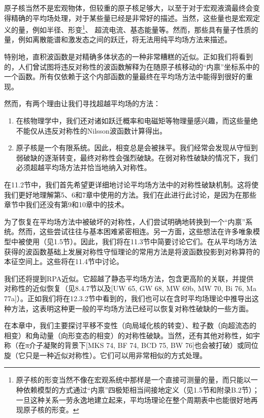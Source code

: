 原子核当然不是宏观物体，但较重的原子核足够大，以至于对于宏观液滴最终会变得精确的平均场处理，对于某些量已经是非常好的描述。当然，这些量也是宏观定义的量，例如半径、形变\footnote{原子核的形变当然不像在宏观系统中那样是一个直接可测量的量，而只能以一种依赖模型的方式通过“内禀”四极矩相当间接地定义（见1.5节和附录B.2节）；一旦这种关系一劳永逸地建立起来，平均场理论在整个周期表中也能很好地再现原子核的形变。}、
超流电流、基态能量等。然而，那些具有量子性质的量，例如离散能谱和激发态之间的跃迁，将无法用纯平均场方法来描述。

特别地，直积波函数是对精确多体状态的一种非常糟糕的近似。正如我们将看到的，人们曾试图将违反对称性的波函数解释为在随原子核移动的“内禀”坐标系中的一个函数。所有仅依赖于这个内部函数的量最终在平均场方法中能得到很好的重现。

然而，有两个理由让我们寻找超越平均场的方法：
\begin{enumerate}
\item 在核物理学中，我们还对诸如跃迁概率和电磁矩等物理量感兴趣，而这些量绝不能仅从违反对称性的Nilsson波函数计算得出。
\item 原子核是一个有限系统。因此，相变总是会被抹平。我们经常会发现从守恒到弱破缺的逐渐转变，最终对称性会强烈破缺。在弱对称性破缺的情况下，我们必须超越平均场方法并恰当地纳入对称性。
\end{enumerate}
在11.2节中，我们首先希望更详细地讨论平均场方法中的对称性破缺机制。这将使我们更好地理解第5、6和7章中使用的方法。我们在此进行此讨论，是因为在那些章节中我们还没有第9和10章中的技术。

为了恢复在平均场方法中被破坏的对称性，人们尝试明确地转换到一个“内禀”系统。然而，这些尝试往往与基本困难紧密相连。另一方面，这些想法在许多唯象模型中被使用（见1.5节）。因此，我们将在11.3节中简要讨论它们。在从平均场方法获得的波函数基础上发展对称性守恒理论的常用方法是将波函数投影到对称算符的本征空间上。这些将在11.4节中讨论。

我们还将提到RPA近似。它超越了静态平均场方法，包含更高阶的关联，并提供对称性的近似恢复（见8.4.7节以及{[}UW 65, GW
68, MW 69b, MW 70, Bi 76, Ma 77a{]}）。正如我们将在12.3.2节中看到的，我们也可以在含时平均场理论中推导出这种方法，这表明这种更一般的平均场方法已经可以恢复对称性破缺的一些方面。

在本章中，我们主要探讨平移不变性（向局域化核的转变）、粒子数（向超流态的相变）和角动量（向形变态的相变）的对称性破缺。当然，还有其他对称性，如宇称\cite{BSB69}（在π介子凝聚的背景下{[}MKS
74, BF 74, BCD 75, BW 76{]}也会被打破）或同位旋（它只是一种近似对称性\cite{GW68}）。它们可以用非常相似的方式处理。

